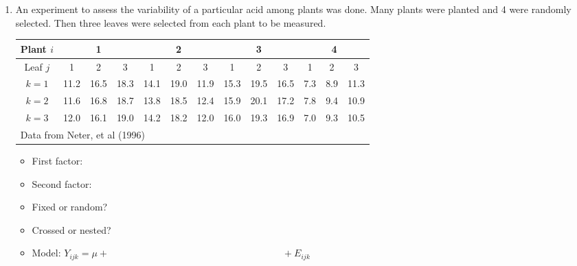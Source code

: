 \begin{enumerate}
\item An experiment to assess the variability of a particular acid among plants was done.  Many plants were planted and 4 were randomly selected.  Then three leaves were selected from each plant to be measured.
\begin{large}
\begin{center}
\begin{tabular}{c|ccc|ccc|ccc|ccc}
Plant $i$ & \multicolumn{3}{c}{1} & \multicolumn{3}{c}{2} & \multicolumn{3}{c}{3} & \multicolumn{3}{c}{4}  \\ \hline
Leaf $j$ & 1 & 2 & 3 & 1 & 2 & 3 & 1 & 2 & 3 & 1 & 2 & 3 \\ \hline
$k=1$ & 11.2 & 16.5 & 18.3 & 14.1 & 19.0 & 11.9 & 15.3 & 19.5 & 16.5 & 7.3 & 8.9 & 11.3 \\
$k=2$ & 11.6 & 16.8 & 18.7 & 13.8 & 18.5 & 12.4 & 15.9 & 20.1 & 17.2 & 7.8 & 9.4 & 10.9 \\
$k=3$ & 12.0 & 16.1 & 19.0 & 14.2 & 18.2 & 12.0 & 16.0 & 19.3 & 16.9 & 7.0 & 9.3 & 10.5 \\ \hline
\multicolumn{12}{l}{Data from Neter, et al (1996)}
\end{tabular}
\end{center}
\end{large}

\begin{itemize}
\item First factor:
\item Second factor:
\item Fixed or random?
\item Crossed or nested?
\item Model:  
$Y_{ijk} = \mu + \hspace{3in} + E_{ijk}$
\end{itemize}



\end{enumerate}
